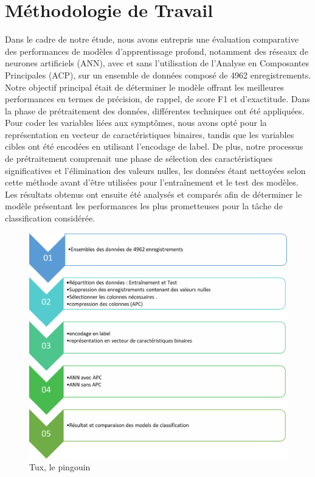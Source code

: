 \section{Méthodologie de Travail}
Dans le cadre de notre étude, nous avons entrepris une évaluation comparative des performances de modèles d'apprentissage profond, notamment des réseaux de neurones artificiels (ANN), avec et sans l'utilisation de l'Analyse en Composantes Principales (ACP), sur un ensemble de données composé de 4962 enregistrements. Notre objectif principal était de déterminer le modèle offrant les meilleures performances en termes de précision, de rappel, de score F1 et d'exactitude. Dans la phase de prétraitement des données, différentes techniques ont été appliquées. Pour coder les variables liées aux symptômes, nous avons opté pour la représentation en vecteur de caractéristiques binaires, tandis que les variables cibles ont été encodées en utilisant l'encodage de label. De plus, notre processus de prétraitement comprenait une phase de sélection des caractéristiques significatives et l'élimination des valeurs nulles, les données étant nettoyées selon cette méthode avant d'être utilisées pour l'entraînement et le test des modèles. Les résultats obtenus ont ensuite été analysés et comparés afin de déterminer le modèle présentant les performances les plus prometteuses pour la tâche de classification considérée.

\begin{figure}[!p]
    \includegraphics[scale=0.45]{Images/Chapter4/etapes_det.png}
    \caption{Tux, le pingouin}
    \label{fig:18}
\end{figure}

